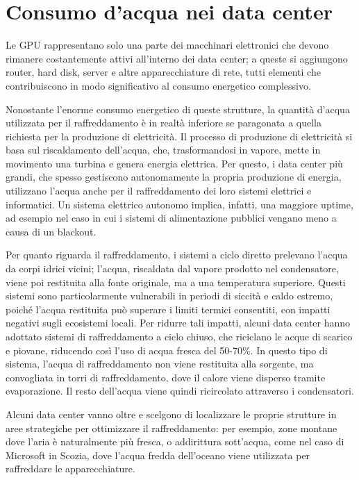 \documentclass[12pt,a4paper,oneside]{book}
\begin{document}
\chapter{Consumo d'acqua nei data center}

Le GPU rappresentano solo una parte dei macchinari elettronici che devono rimanere costantemente attivi all'interno dei data center; a queste si aggiungono router, hard disk, server e altre apparecchiature di rete, tutti elementi che contribuiscono in modo significativo al consumo energetico complessivo.

Nonostante l'enorme consumo energetico di queste strutture, la quantità d'acqua utilizzata per il raffreddamento è in realtà inferiore se paragonata a quella richiesta per la produzione di elettricità. Il processo di produzione di elettricità si basa sul riscaldamento dell'acqua, che, trasformandosi in vapore, mette in movimento una turbina e genera energia elettrica.
Per questo, i data center più grandi, che spesso gestiscono autonomamente la propria produzione di energia, utilizzano l'acqua anche per il raffreddamento dei loro sistemi elettrici e informatici. Un sistema elettrico autonomo implica, infatti, una maggiore uptime, ad esempio nel caso in cui i sistemi di alimentazione pubblici vengano meno a causa di un blackout.

Per quanto riguarda il raffreddamento, i sistemi a ciclo diretto prelevano l'acqua da corpi idrici vicini; l'acqua, riscaldata dal vapore prodotto nel condensatore, viene poi restituita alla fonte originale, ma a una temperatura superiore. Questi sistemi sono particolarmente vulnerabili in periodi di siccità e caldo estremo, poiché l'acqua restituita può superare i limiti termici consentiti, con impatti negativi sugli ecosistemi locali.
Per ridurre tali impatti, alcuni data center hanno adottato sistemi di raffreddamento a ciclo chiuso, che riciclano le acque di scarico e piovane, riducendo così l'uso di acqua fresca del 50-70\%. In questo tipo di sistema, l'acqua di raffreddamento non viene restituita alla sorgente, ma convogliata in torri di raffreddamento, dove il calore viene disperso tramite evaporazione. Il resto dell'acqua viene quindi ricircolato attraverso i condensatori.

Alcuni data center vanno oltre e scelgono di localizzare le proprie strutture in aree strategiche per ottimizzare il raffreddamento: per esempio, zone montane dove l'aria è naturalmente più fresca, o addirittura sott'acqua, come nel caso di Microsoft in Scozia, dove l'acqua fredda dell'oceano viene utilizzata per raffreddare le apparecchiature.
\end{document}

